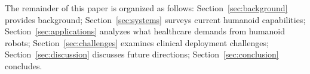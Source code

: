 The remainder of this paper is organized as follows:
Section~\ref{sec:background} provides background; Section~\ref{sec:systems}
surveys current humanoid capabilities; Section~\ref{sec:applications} analyzes
what healthcare demands from humanoid robots; Section~\ref{sec:challenges}
examines clinical deployment challenges; Section~\ref{sec:discussion} discusses
future directions; Section~\ref{sec:conclusion} concludes.

